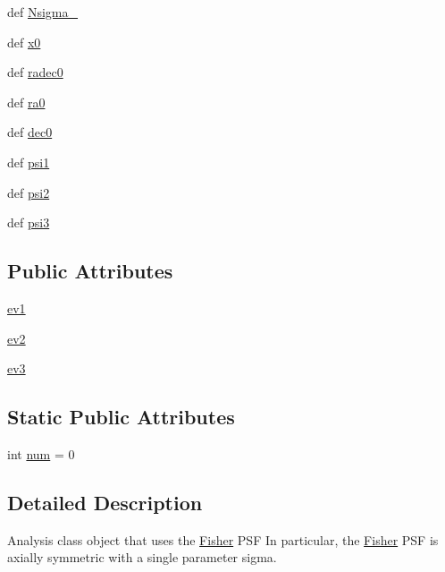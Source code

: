 \begin{DoxyCompactItemize}
def \hyperlink{classamonpy_1_1anal_1_1cluster_1_1_fisher__tp_ae0f081a73cd37010cb67adad216a897b}{Nsigma\-\_}
\item 
def \hyperlink{classamonpy_1_1anal_1_1cluster_1_1_fisher__tp_a604d04ddafd3c54e9ad325adb5e2556b}{x0}
\item 
def \hyperlink{classamonpy_1_1anal_1_1cluster_1_1_fisher__tp_a42d446196e564fc5317470a06cfbba06}{radec0}
\item 
def \hyperlink{classamonpy_1_1anal_1_1cluster_1_1_fisher__tp_a6fd4dc5594118f856b0b92f300168c29}{ra0}
\item 
def \hyperlink{classamonpy_1_1anal_1_1cluster_1_1_fisher__tp_a53495bcf6ab1da20791abc5995e91b80}{dec0}
\item 
def \hyperlink{classamonpy_1_1anal_1_1cluster_1_1_fisher__tp_a3c0bdae70739eb63d804b83bd45cebf2}{psi1}
\item 
def \hyperlink{classamonpy_1_1anal_1_1cluster_1_1_fisher__tp_af15569d830935e813e16a0a073de023a}{psi2}
\item 
def \hyperlink{classamonpy_1_1anal_1_1cluster_1_1_fisher__tp_a2e521151db6f513eeaa52c62f3ae2657}{psi3}
\end{DoxyCompactItemize}
\subsection*{Public Attributes}
\begin{DoxyCompactItemize}
\item 
\hyperlink{classamonpy_1_1anal_1_1cluster_1_1_fisher__tp_a4b282e58dde2fdfc1c815e6f6d2fba5f}{ev1}
\item 
\hyperlink{classamonpy_1_1anal_1_1cluster_1_1_fisher__tp_a5aad4ba062a0103b45387fea062e00f9}{ev2}
\item 
\hyperlink{classamonpy_1_1anal_1_1cluster_1_1_fisher__tp_a222ee1411c4db3f384af8421292f2ec1}{ev3}
\end{DoxyCompactItemize}
\subsection*{Static Public Attributes}
\begin{DoxyCompactItemize}
\item 
int \hyperlink{classamonpy_1_1anal_1_1cluster_1_1_fisher__tp_a3eff8425c58f4b61a8bff758141bfc3e}{num} = 0
\end{DoxyCompactItemize}


\subsection{Detailed Description}
Analysis class object that uses the \hyperlink{classamonpy_1_1anal_1_1cluster_1_1_fisher}{Fisher} P\-S\-F In particular, the \hyperlink{classamonpy_1_1anal_1_1cluster_1_1_fisher}{Fisher} P\-S\-F is axially symmetric with a single parameter sigma. 

